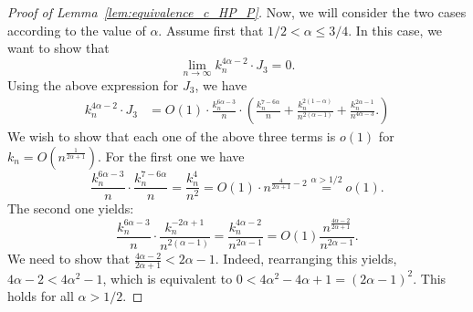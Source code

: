 \begin{proof}[Proof of Lemma~\ref{lem:equivalence_c_HP_P}]

Now, we will consider the two cases according to the value of $\alpha$. 
Assume first that $1/2 < \alpha \leq 3/4$. 
In this case, we want to show that 
\begin{equation} \label{eq:int3_to_prove_I}
\lim_{n \to \infty} k_n^{4\alpha -2} \cdot J_3 = 0. 
\end{equation}
Using the above expression for $J_3$, we have 
\begin{align*} 
 k_n^{4\alpha -2} \cdot J_3 &= O(1) \cdot  
 \frac{k_n^{6\alpha -3}}{n} \cdot 
\left( 
\frac{k_n^{7-6\alpha}}{n} + \frac{k_n^{2(1-\alpha)}}{n^{2(\alpha-1)}} 
+\frac{k_n^{2\alpha-1}}{n^{4\alpha - 3}}.
\right) 
\end{align*}
We wish to show that each one of the above three terms is $o(1)$ for $k_n = O(n^{\frac{1}{2\alpha +1}})$. 
For the first one we have 
$$ \frac{k_n^{6\alpha -3}}{n} \cdot \frac{k_n^{7-6\alpha}}{n} = \frac{k_n^{4}}{n^2} = O(1) \cdot n^{\frac{4}{2\alpha +1} -2} \stackrel{\alpha >1/2}{=} o(1). 
$$
The second one yields: 
$$ \frac{k_n^{6\alpha -3}}{n} \cdot  \frac{k_n^{-2\alpha+1}}{n^{2(\alpha-1)}} =\frac{k_n^{4\alpha -2}}{n^{2\alpha -1}} =O(1) \frac{n^{\frac{4\alpha -2}{2\alpha+1}}}{n^{2\alpha -1}}.$$
We need to show that $\frac{4\alpha -2}{2\alpha+1}< 2\alpha -1$. Indeed, rearranging this 
 yields, $4\alpha -2 < 4\alpha^2 -1$, which is equivalent to $0< 4\alpha^2 - 4\alpha +1=(2\alpha- 1)^2$. This holds for all $\alpha >1/2$.  
 

\end{proof}

